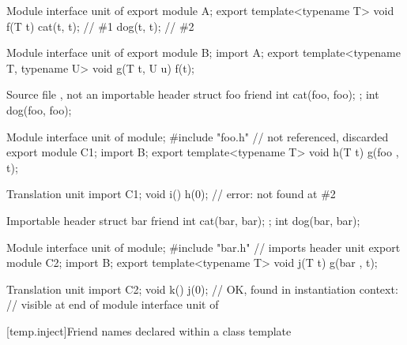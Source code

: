 \pnum
\begin{example}
\begin{codeblocktu}{Module interface unit of }
export module A;
export template<typename T>
void f(T t) {
  cat(t, t);            // \#1
  dog(t, t);            // \#2
}
\end{codeblocktu}

\begin{codeblocktu}{Module interface unit of }
export module B;
import A;
export template<typename T, typename U>
void g(T t, U u) {
  f(t);
}
\end{codeblocktu}

\begin{codeblocktu}{Source file , not an importable header}
struct foo {
  friend int cat(foo, foo);
};
int dog(foo, foo);
\end{codeblocktu}

\begin{codeblocktu}{Module interface unit of }
module;
#include "foo.h"        //  not referenced, discarded
export module C1;
import B;
export template<typename T>
void h(T t) {
  g(foo{ }, t);
}
\end{codeblocktu}

\begin{codeblocktu}{Translation unit}
import C1;
void i() {
   h(0);                // error:  not found at \#2
}
\end{codeblocktu}

\begin{codeblocktu}{Importable header }
struct bar {
  friend int cat(bar, bar);
};
int dog(bar, bar);
\end{codeblocktu}

\begin{codeblocktu}{Module interface unit of }
module;
#include "bar.h"        // imports header unit 
export module C2;
import B;
export template<typename T>
void j(T t) {
  g(bar{ }, t);
}
\end{codeblocktu}

\begin{codeblocktu}{Translation unit}
import C2;
void k() {
   j(0);                // OK,  found in instantiation context:
                        // visible at end of module interface unit of 
}
\end{codeblocktu}
\end{example}

[temp.inject]{Friend names declared within a class template}

